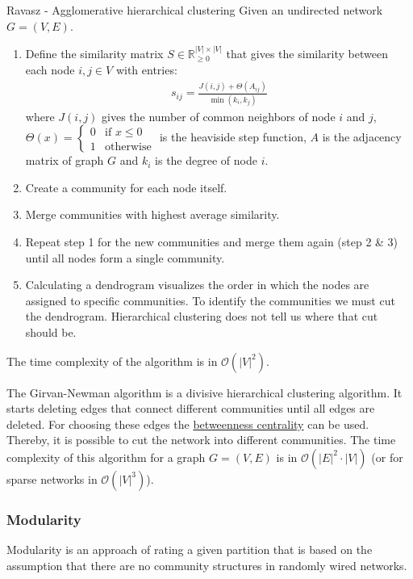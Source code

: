 \documentclass[english]{panikzettel}
\begin{document}
\begin{algo}{Ravasz - Agglomerative hierarchical clustering}
Given an undirected network $ G = (V,E) $.
\begin{enumerate}
	\item Define the similarity matrix $ S \in \mathbb{R}_{\geq 0}^{|V| \times |V|} $ that gives the similarity between each node $ i,j \in V $ with entries:
	\begin{align*}
		s_{ij} = \frac{J(i,j) + \Theta (A_{ij})}{\min(k_i, k_j)}
	\end{align*}
	where $ J(i,j) $ gives the number of common neighbors of node $ i $ and $ j $, $ \Theta(x) = \begin{cases}
	0 & \text{if } x \leq 0 \\
	1 & \text{otherwise}
	\end{cases} $ is the heaviside step function, $ A $ is the adjacency matrix of graph $ G $ and $ k_i $ is the degree of node $ i $.

	\item Create a community for each node itself.
	\item Merge communities with highest average similarity.
	\item Repeat step 1 for the new communities and merge them again (step 2 \& 3) until all nodes form a single community.
	\item Calculating a dendrogram visualizes the order in which the nodes are assigned to specific communities.
	To identify the communities we must cut	the dendrogram.
	Hierarchical clustering	does not tell us where that cut should be.
\end{enumerate}
\end{algo}
The time complexity of the algorithm is in $ \mathcal{O}(|V|^2) $.

The Girvan-Newman algorithm is a divisive hierarchical clustering algorithm.
It starts deleting edges that connect different communities until all edges are deleted.
For choosing these edges the \hyperref[sec:betweenness_centrality]{betweenness centrality} can be used.
Thereby, it is possible to cut the network into different communities.
The time complexity of this algorithm for a graph $ G = (V,E) $ is in $ \mathcal{O}(|E|^2 \cdot |V|) $ (or for sparse networks in $ \mathcal{O}(|V|^3) $).

\subsubsection{Modularity}
Modularity is an approach of rating a given partition that is based on the assumption that there are no community structures in randomly wired networks.
\end{document}
